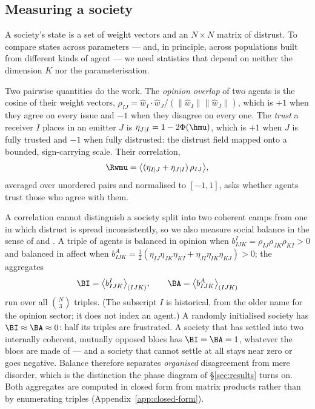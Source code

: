 \subsection{Measuring a society}
\label{sec:order-params}

A society's state is a set of weight vectors and an $N\times N$ matrix of distrust.
To compare states across parameters --- and, in principle, across populations built
from different kinds of agent --- we need statistics that depend on neither the
dimension $K$ nor the parameterisation.

Two pairwise quantities do the work. The \emph{opinion overlap} of two agents is
the cosine of their weight vectors,
$\rho_{IJ}=\hat{w}_I\cdot\hat{w}_J/(\|\hat{w}_I\|\|\hat{w}_J\|)$, which is $+1$
when they agree on every issue and $-1$ when they disagree on every one. The
\emph{trust} a receiver $I$ places in an emitter $J$ is $\eta_{J|I}=1-2\Phi(\hmu)$,
which is $+1$ when $J$ is fully trusted and $-1$ when fully distrusted: the distrust
field mapped onto a bounded, sign-carrying scale. Their correlation,
%
\begin{equation}
  \Rwmu = \bigl\langle (\eta_{I|J}+\eta_{J|I})\,\rho_{IJ} \bigr\rangle,
  \label{eq:rwmu}
\end{equation}
%
averaged over unordered pairs and normalised to $[-1,1]$, asks whether agents trust
those who agree with them.

A correlation cannot distinguish a society split into two coherent camps from one
in which distrust is spread inconsistently, so we also measure social balance in the
sense of \citet{heider1946attitudes} and \citet{cartwright1956structural}. A triple
of agents is balanced in opinion when $b^{I}_{IJK}=\rho_{IJ}\rho_{JK}\rho_{KI}>0$
and balanced in affect when
$b^{A}_{IJK}=\tfrac{1}{2}(\eta_{IJ}\eta_{JK}\eta_{KI}+\eta_{JI}\eta_{IK}\eta_{KJ})>0$;
the aggregates
%
\begin{equation}
  \BI = \bigl\langle b^{I}_{IJK}\bigr\rangle_{(IJK)},
  \qquad
  \BA = \bigl\langle b^{A}_{IJK}\bigr\rangle_{(IJK)}
  \label{eq:balance}
\end{equation}
%
run over all $\binom{N}{3}$ triples. (The subscript $I$ is historical, from the
older name for the opinion sector; it does not index an agent.) A randomly
initialised society has $\BI\approx\BA\approx0$: half its triples are frustrated. A
society that has settled into two internally coherent, mutually opposed blocs has
$\BI=\BA=1$, whatever the blocs are made of --- and a society that cannot settle at
all stays near zero or goes negative. Balance therefore separates \emph{organised}
disagreement from mere disorder, which is the distinction the phase diagram of
\S\ref{sec:results} turns on. Both aggregates are computed in closed form from
matrix products rather than by enumerating triples
(Appendix~\ref{app:closed-form}).

